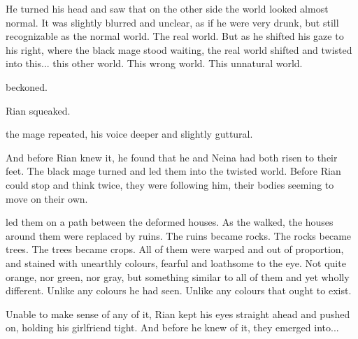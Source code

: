 He turned his head and saw that on the other side the world looked almost normal. 
It was slightly blurred and unclear, as if he were very drunk, but still recognizable as the normal world. 
The real world. 
But as he shifted his gaze to his right, where the black mage stood waiting, the real world shifted and twisted into this... this other world. 
This wrong world. 
This unnatural world. 

\Ishnaruchaefir{} beckoned. 

 Rian squeaked. 

 the \draconian{} mage repeated, his voice deeper and slightly guttural. 

And before Rian knew it, he found that he and Neina had both risen to their feet. 
The black mage turned and led them into the twisted world. 
Before Rian could stop and think twice, they were following him, their bodies seeming to move on their own. 

\Ishnaruchaefir{} led them on a path between the deformed houses. 
As the walked, the houses around them were replaced by ruins. 
The ruins became rocks. 
The rocks became trees. 
The trees became crops. 
All of them were warped and out of proportion, and stained with unearthly colours, fearful and loathsome to the eye. 
Not quite orange, nor green, nor gray, but something similar to all of them and yet wholly different. 
Unlike any colours he had seen. 
Unlike any colours that ought to exist. 

Unable to make sense of any of it, Rian kept his eyes straight ahead and pushed on, holding his girlfriend tight. 
And before he knew of it, they emerged into...

% 
% 
% 
% 
% 
% 

